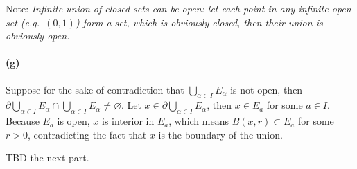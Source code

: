 Note: \emph{Infinite union of closed sets can be open: let each point in any infinite open set (e.g.\ $(0,1)$) form a set, which is obviously closed, then their union is obviously open.}

\paragraph{(g)}
Suppose for the sake of contradiction that $\bigcup_{\alpha \in I} E_\alpha$ is not open, then $\partial \bigcup_{\alpha \in I}E_\alpha \cap \bigcup_{\alpha \in I}E_\alpha \ne \varnothing$. Let $x \in \partial \bigcup_{\alpha \in I}E_\alpha$, then $x \in E_a$ for some $a \in I$. Because $E_a$ is open, $x$ is interior in $E_a$, which means $B(x, r) \subset E_a$ for some $r > 0$, contradicting the fact that $x$ is the boundary of the union.

TBD the next part.
